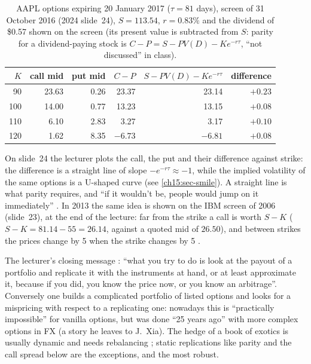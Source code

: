 \begin{paracol}{2}
\begin{table}[ht]
\centering\small
\begin{tabular}{r r r r r r}
\toprule
$K$ & call mid & put mid & $C-P$ & $S-PV(D)-Ke^{-r\tau}$ & difference\\
\midrule
90 & 23.63 & 0.26 & 23.37 & 23.14 & $+0.23$\\
100 & 14.00 & 0.77 & 13.23 & 13.15 & $+0.08$\\
110 & 6.10 & 2.83 & 3.27 & 3.17 & $+0.10$\\
120 & 1.62 & 8.35 & $-6.73$ & $-6.81$ & $+0.08$\\
\bottomrule
\end{tabular}
\caption{AAPL options expiring 20 January 2017 ($\tau=81$ days), screen of 31 October 2016 (2024 slide~24), $S=113.54$, $r=0.83\%$ and the dividend of \$0.57 shown on the screen (its present value is
subtracted from $S$: parity for a dividend-paying stock is $C-P=S-PV(D)-Ke^{-r\tau}$, ``not discussed'' in class).}\label{ch15:tab-aapl}
\end{table}
On slide~24 the lecturer plots the call, the put and their difference against strike: the difference is a straight line of slope $-e^{-r\tau}\approx-1$, while the implied volatility
of the same options is a U-shaped curve (see \cref{ch15:sec-smile}). A straight line is what parity requires, and ``if it wouldn't be, people would jump on it immediately'' .
In 2013 the same idea is shown on the IBM screen of 2006 (slide~23), at the end of the lecture: far from the strike a call is worth $S-K$ ($S-K=81.14-55=26.14$, against a quoted mid of $26.50$), and between
strikes the prices change by 5 when the strike changes by 5 .

\begin{finance}
The lecturer's closing message : ``what you try to do is look at the payout of a portfolio and replicate it with the instruments at hand, or at least approximate it,
because if you did, you know the price now, or you know an arbitrage''. Conversely one builds a complicated portfolio of listed options and looks for a mispricing with respect to a replicating one: nowadays this
is ``practically impossible'' for vanilla options, but was done ``25 years ago'' with more complex options in FX (a story he leaves to J.~Xia). The hedge of a book of exotics is usually dynamic and needs rebalancing
; static replications like parity and the call spread below are the exceptions, and the most robust.
\end{finance}


\end{paracol}
